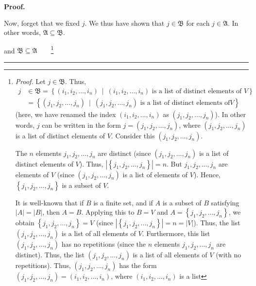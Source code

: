 \documentclass[numbers=enddot,12pt,final,onecolumn,notitlepage]{scrartcl}%
\theoremstyle{definition}
\newenvironment{proof}[1][Proof]{\noindent\textbf{#1.} }{\ \rule{0.5em}{0.5em}}
\newenvironment{verlong}{}{}
\begin{document}
\begin{verlong}
\begin{proof}
{\par
Now, forget that we fixed $j$. We thus have shown that $j\in\mathfrak{B}$ for
each $j\in\mathfrak{A}$. In other words, $\mathfrak{A}\subseteq\mathfrak{B}$.}
and $\mathfrak{B}\subseteq\mathfrak{A}$\ \ \ \ \footnote{\textit{Proof.} Let
$j\in\mathfrak{B}$. Thus,
\begin{align*}
j  &  \in\mathfrak{B}=\left\{  \left(  i_{1},i_{2},\ldots,i_{n}\right)
\ \mid\ \left(  i_{1},i_{2},\ldots,i_{n}\right)  \text{ is a list of distinct
elements of }V\right\} \\
&  =\left\{  \left(  j_{1},j_{2},\ldots,j_{n}\right)  \ \mid\ \left(
j_{1},j_{2},\ldots,j_{n}\right)  \text{ is a list of distinct elements of
}V\right\}
\end{align*}
(here, we have renamed the index $\left(  i_{1},i_{2},\ldots,i_{n}\right)  $
as $\left(  j_{1},j_{2},\ldots,j_{n}\right)  $). In other words, $j$ can be
written in the form $j=\left(  j_{1},j_{2},\ldots,j_{n}\right)  $, where
$\left(  j_{1},j_{2},\ldots,j_{n}\right)  $ is a list of distinct elements of
$V$. Consider this $\left(  j_{1},j_{2},\ldots,j_{n}\right)  $.
\par
The $n$ elements $j_{1},j_{2},\ldots,j_{n}$ are distinct (since $\left(
j_{1},j_{2},\ldots,j_{n}\right)  $ is a list of distinct elements of $V$).
Thus, $\left\vert \left\{  j_{1},j_{2},\ldots,j_{n}\right\}  \right\vert =n$.
But $j_{1},j_{2},\ldots,j_{n}$ are elements of $V$ (since $\left(  j_{1}%
,j_{2},\ldots,j_{n}\right)  $ is a list of elements of $V$). Hence, $\left\{
j_{1},j_{2},\ldots,j_{n}\right\}  $ is a subset of $V$.
\par
It is well-known that if $B$ is a finite set, and if $A$ is a subset of $B$
satisfying $\left\vert A\right\vert =\left\vert B\right\vert $, then $A=B$.
Applying this to $B=V$ and $A=\left\{  j_{1},j_{2},\ldots,j_{n}\right\}  $, we
obtain $\left\{  j_{1},j_{2},\ldots,j_{n}\right\}  =V$ (since $\left\vert
\left\{  j_{1},j_{2},\ldots,j_{n}\right\}  \right\vert =n=\left\vert
V\right\vert $). Thus, the list $\left(  j_{1},j_{2},\ldots,j_{n}\right)  $ is
a list of all elements of $V$. Furthermore, this list $\left(  j_{1}%
,j_{2},\ldots,j_{n}\right)  $ has no repetitions (since the $n$ elements
$j_{1},j_{2},\ldots,j_{n}$ are distinct). Thus, the list $\left(  j_{1}%
,j_{2},\ldots,j_{n}\right)  $ is a list of all elements of $V$ (with no
repetitions). Thus, $\left(  j_{1},j_{2},\ldots,j_{n}\right)  $ has the form
$\left(  j_{1},j_{2},\ldots,j_{n}\right)  =\left(  i_{1},i_{2},\ldots
,i_{n}\right)  $, where $\left(  i_{1},i_{2},\ldots,i_{n}\right)  $ is a list
}
\end{proof}
\end{verlong}
\end{document}
